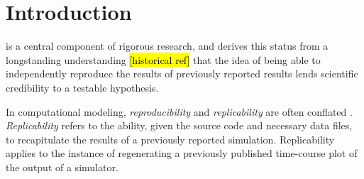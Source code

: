 \documentclass[journal,transmag]{IEEEtran}
\begin{document}
%
\IEEEpeerreviewmaketitle



\section{Introduction}
% 
% 
% 
% 
 is a central component of rigorous
research, and derives this status from a longstanding understanding \hl{[historical ref]}
that the idea of being able to independently reproduce the results of
previously reported results lends scientific credibility to
a testable hypothesis.


In computational modeling, \textit{reproducibility}
and \textit{replicability} are often conflated \cite{drummond2009replicability}.
\textit{Replicability} refers to the ability, given the source code and
necessary data files, to recapitulate the results of a previously reported simulation.
Replicability applies to the instance of regenerating a previously published time-course
plot of the output of a simulator.
\end{document}
